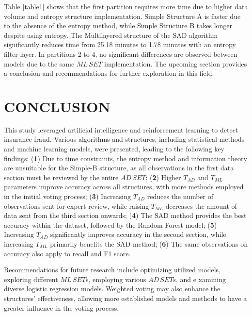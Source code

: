 \documentclass[12pt]{article}
\begin{document}
Table \ref{table1} shows that the first partition requires more
time due to higher data volume and entropy structure
implementation. Simple Structure A is faster due to the absence of
the entropy method, while Simple Structure B takes longer despite
using entropy. The  Multilayered structure of the SAD algorithm significantly reduces time
from 25.18 minutes to 1.78 minutes with an entropy filter layer.
In partitions 2 to 4, no significant differences are observed
between models due to the same $ML\, SET$ implementation. The
upcoming section provides a conclusion and recommendations for
further exploration in this field.

\section{CONCLUSION}\label{SC:CONCLUSION}
This study leveraged artificial intelligence and reinforcement
learning to detect insurance fraud. Various algorithms and
structures, including statistical methods and machine learning
models, were presented, leading to the following key findings:
({\bf 1}) Due to time constraints, the entropy method and
information theory are unsuitable for the Simple-B structure, as
all observations in the first data section must be reviewed by the
entire $AD\, SET$; ({\bf 2}) Higher $T_{AD}$ and $T_{ML}$ parameters
improve accuracy across all structures, with more methods employed
in the initial voting process; ({\bf 3}) Increasing $T_{AD}$
reduces the number of observations sent for expert review, while
raising $T_{ML}$ decreases the amount of data sent from the third
section onwards; ({\bf 4}) The SAD method provides the best
accuracy within the dataset, followed by the Random Forest model;
({\bf 5}) Increasing $T_{AD}$ significantly improves accuracy in
the second section, while increasing $T_{ML}$ primarily benefits
the SAD method; ({\bf 6}) The same observations on accuracy also
apply to recall and F1 score.

Recommendations for future research include optimizing utilized
models, exploring different $ML\, SET$s, employing various $AD\, SET $s, and e	xamining diverse logistic regression models. Weighted
voting may also enhance the structures' effectiveness, allowing
more established models and methods to have a greater influence in
the voting process.

\baselineskip12pt

\end{document}
